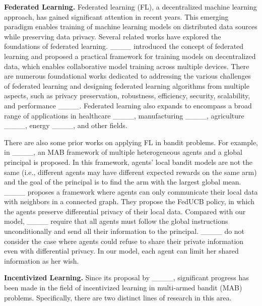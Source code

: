     \textbf{Federated Learning.}
     Federated learning (FL), a decentralized machine learning approach, has gained significant attention in recent years. This emerging paradigm enables training of machine learning models on distributed data sources while preserving data privacy. Several related works have explored the foundations of federated learning. ____ introduced the concept of federated learning and proposed a practical framework for training models on decentralized data, which enables collaborative model training across multiple devices. There are numerous foundational works dedicated to addressing the various challenges of federated learning and designing federated learning algorithms from multiple aspects, such as privacy preservation, robustness, efficiency, security, scalability, and performance ____.  Federated learning also expands to encompass a broad range of applications in healthcare ____, manufacturing ____, agriculture ____, energy ____, and other fields. 
     
     There are also some prior works on applying FL in bandit problems. 
     For example, in ____, an MAB framework of multiple heterogeneous agents and a global principal is proposed. In this framework, agents' local bandit models are not the same (i.e., different agents may have different expected rewards on the same arm) and the goal of the principal is to find the arm with the largest global mean.
    ____ proposes a framework where agents can only communicate their local data with neighbors in a connected graph.  They propose the FedUCB policy, in which the agents preserve differential privacy of their local data. 
    Compared with our model, ____ require that all agents must follow the global instructions unconditionally and send all their information to the principal. ____ do not consider the case where agents could refuse to share their private information even with differential privacy. In our model, each agent can limit her shared information as her wish. 
    
    \textbf{Incentivized Learning.} 
    Since its proposal by ____, significant progress has been made in the field of incentivized learning in multi-armed bandit (MAB) problems. Specifically, there are two distinct lines of research in this area. 

